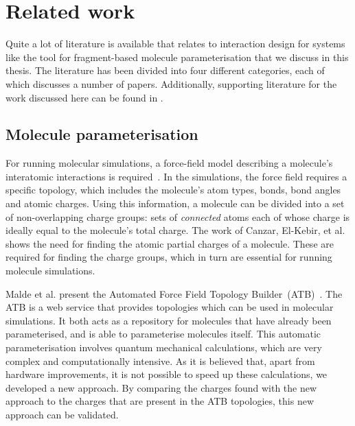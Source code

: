 \chapter{Related work}

Quite a lot of literature is available that relates to interaction design for systems like the tool for fragment-based molecule parameterisation that we discuss in this thesis. The literature has been divided into four different categories, each of which discusses a number of papers. Additionally, supporting literature for the work discussed here can be found in .



\section{Molecule parameterisation}
For running molecular simulations, a force-field model describing a molecule's interatomic interactions is required~\cite{canzar2012charge}. In the simulations, the force field requires a specific topology, which includes the molecule's atom types, bonds, bond angles and atomic charges. Using this information, a molecule can be divided into a set of non-overlapping charge groups: sets of \emph{connected} atoms each of whose charge is ideally equal to the molecule's total charge. The work of Canzar, El-Kebir, et al. shows the need for finding the atomic partial charges of a molecule. These are required for finding the charge groups, which in turn are essential for running molecule simulations.

Malde et al. present the Automated Force Field Topology Builder~(ATB)~\cite{malde2011automated}. The ATB is a web service that provides topologies which can be used in molecular simulations. It both acts as a repository for molecules that have already been parameterised, and is able to parameterise molecules itself. This automatic parameterisation involves quantum mechanical calculations, which are very complex and computationally intensive. As it is believed that, apart from hardware improvements, it is not possible to speed up these calculations, we developed a new approach. By comparing the charges found with the new approach to the charges that are present in the ATB topologies, this new approach can be validated.




